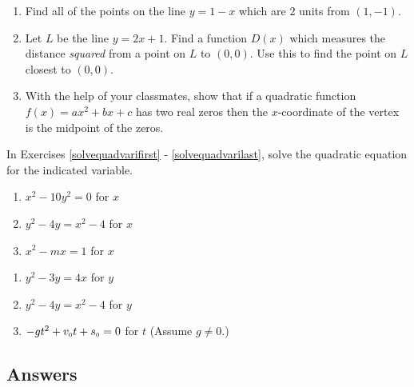 \begin{enumerate}
\item  Find all of the points on the line $y=1-x$ which are $2$ units from $(1,-1)$.

\item  Let $L$ be the line $y = 2x+1$.  Find a function $D(x)$ which measures the distance \textit{squared} from a point on $L$ to $(0,0)$.  Use this to find the point on $L$ closest to $(0,0)$.

\item With the help of your classmates, show that if a quadratic function $f(x) = ax^{2} + bx + c$ has two real zeros then the $x$-coordinate of the vertex is the midpoint of the zeros.

\setcounter{HW}{\value{enumi}}
\end{enumerate}

In Exercises \ref{solvequadvarifirst} - \ref{solvequadvarilast}, solve the quadratic equation for the indicated variable.

\begin{multicols}{3}
\begin{enumerate}
\setcounter{enumi}{\value{HW}}


\item $x^{2} - 10y^{2} = 0$ for $x$ \label{solvequadvarifirst}
\item $y^{2} - 4y = x^{2} - 4$ for $x$
\item $x^{2} - mx = 1$ for $x$

\setcounter{HW}{\value{enumi}}
\end{enumerate}
\end{multicols}

\begin{multicols}{3}
\begin{enumerate}
\setcounter{enumi}{\value{HW}}


\item $y^{2} - 3y = 4x$ for $y$
\item $y^{2} - 4y = x^{2} - 4$ for $y$
\item $-gt^{2} + v_{\mbox{\tiny $0$}}t + s_{\mbox{\tiny $0$}} = 0$ for $t$ (Assume $g \neq 0$.) \label{solvequadvarilast}

\setcounter{HW}{\value{enumi}}
\end{enumerate}
\end{multicols}


\newpage

\subsection{Answers}

